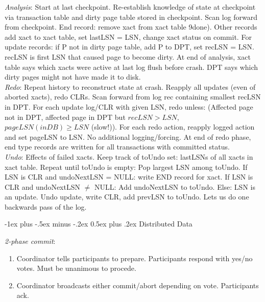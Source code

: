 \documentclass[10pt,landscape]{article}
\makeatletter
\renewcommand{\section}{\@startsection{section}{1}{0mm}%
                                {-1ex plus -.5ex minus -.2ex}%
                                {0.5ex plus .2ex}%
                                {\normalfont\large\bfseries}}
\makeatother
\begin{document}
\begin{multicols}{3}
\textit{Analysis}: Start at last checkpoint. Re-establish knowledge of state at checkpoint via transaction table and dirty page table stored in checkpoint. Scan log forward from checkpoint. End record: remove xact from xact table 9done). Other records add xact to xact table, set lastLSN = LSN, change xact status on commit. For update records: if P not in dirty page table, add P to DPT, set recLSN = LSN. recLSN is first LSN that caused page to become dirty. At end of analysis, xact table says which xacts were active at last log flush before crash. DPT says which dirty pages might not have made it to disk. \\
\textit{Redo}: Repeat history to reconstruct state at crash. Reapply all updates (even of aborted xacts), redo CLRs. Scan forward from log rec containing smallest recLSN in DPT. For each update log/CLR with given LSN, redo unless: (Affected page not in DPT, affected page in DPT but $recLSN > LSN$, $pageLSN(inDB) \ge LSN$ (slow!)). For each redo action, reapply logged action and set pageLSN to LSN. No additional logging/forcing. At end of redo phase, end type records are written for all transactions with committed status. \\
\textit{Undo}: Effects of failed xacts. Keep track of toUndo set: lastLSNs of all xacts in xact table. Repeat until toUndo is empty: Pop largest LSN among toUndo. If LSN is CLR and undoNextLSN = NULL: write END record for xact. If LSN is CLR and undoNextLSN $\ne$ NULL: Add undoNextLSN to toUndo. Else: LSN is an update. Undo update, write CLR, add prevLSN to toUndo. Lets us do one backwards pass of the log.


\section{Distributed Data}

\textit{2-phase commit}:

\begin{enumerate}
  \item Coordinator tells participants to prepare. Participants respond with yes/no votes. Must be unanimous to procede.
  \item Coordinator broadcasts either commit/abort depending on vote. Participants ack.
\end{enumerate}




\end{multicols}
\end{document}
